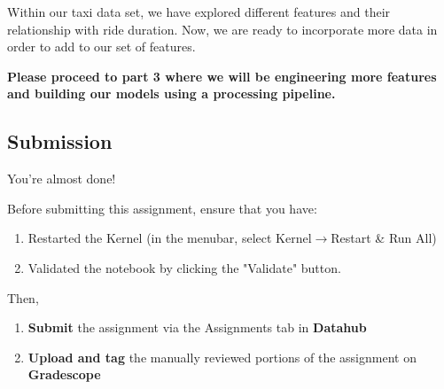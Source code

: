 \documentclass[11pt]{article}
\providecommand{\tightlist}{%
      \setlength{\itemsep}{0pt}\setlength{\parskip}{0pt}}
\begin{document}
Within our taxi data set, we have explored different features and their
relationship with ride duration. Now, we are ready to incorporate more
data in order to add to our set of features.

    \textbf{Please proceed to part 3 where we will be engineering more
features and building our models using a processing pipeline.}

    \subsection{Submission}\label{submission}

You're almost done!

Before submitting this assignment, ensure that you have:

\begin{enumerate}
\def\labelenumi{\arabic{enumi}.}
\tightlist
\item
  Restarted the Kernel (in the menubar, select
  Kernel\(\rightarrow\)Restart \& Run All)
\item
  Validated the notebook by clicking the "Validate" button.
\end{enumerate}

Then,

\begin{enumerate}
\def\labelenumi{\arabic{enumi}.}
\tightlist
\item
  \textbf{Submit} the assignment via the Assignments tab in
  \textbf{Datahub}
\item
  \textbf{Upload and tag} the manually reviewed portions of the
  assignment on \textbf{Gradescope}
\end{enumerate}


    
    
    
    
\end{document}
